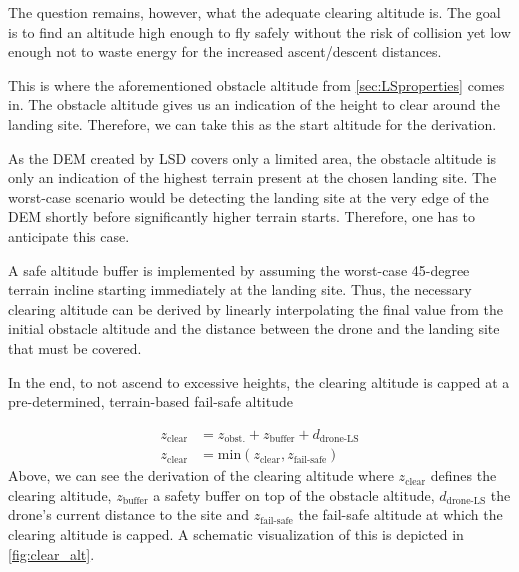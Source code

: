 \begin{itemize}
    The question remains, however, what the adequate clearing altitude is. The goal is to find an altitude high enough to fly safely without the risk of collision yet low enough not to waste energy for the increased ascent/descent distances.

    This is where the aforementioned obstacle altitude from \cref{sec:LSproperties} comes in. The obstacle altitude gives us an indication of the height to clear around the landing site. Therefore, we can take this as the start altitude for the derivation.

    As the DEM created by LSD covers only a limited area, the obstacle altitude is only an indication of the highest terrain present at the chosen landing site. The worst-case scenario would be detecting the landing site at the very edge of the DEM shortly before significantly higher terrain starts. Therefore, one has to anticipate this case. 

    A safe altitude buffer is implemented by assuming the worst-case 45-degree terrain incline starting immediately at the landing site. Thus, the necessary clearing altitude can be derived by linearly interpolating the final value from the initial obstacle altitude and the distance between the drone and the landing site that must be covered.

    In the end, to not ascend to excessive heights, the clearing altitude is capped at a pre-determined, terrain-based fail-safe altitude

    \begin{align}
        z_{\text{clear}} &= z_{\text{obst.}} + z_{\text{buffer}} + d_{\text{drone-LS}}\\
        z_{\text{clear}} &= \text{min}\left(z_{\text{clear}}, z_{\text{fail-safe}}\right)
    \end{align}
    Above, we can see the derivation of the clearing altitude where $z_{\text{clear}}$ defines the clearing altitude, $z_{\text{buffer}}$ a safety buffer on top of the obstacle altitude, $d_{\text{drone-LS}}$ the drone's current distance to the site and $z_{\text{fail-safe}}$ the fail-safe altitude at which the clearing altitude is capped. A schematic visualization of this is depicted in \cref{fig:clear_alt}.
    \clearpage%


\end{itemize}
